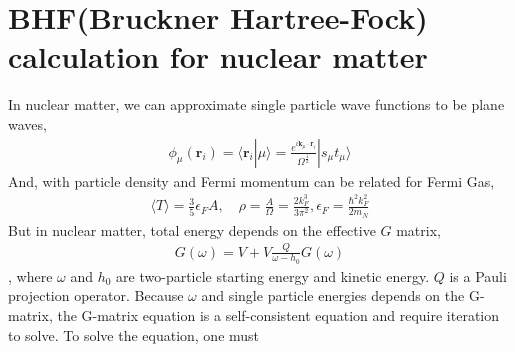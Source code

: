 \documentclass[10pt]{article}
\def\bm{\boldsymbol}
\newcommand{\bea}{\begin{eqnarray}}
\newcommand{\eea}{\end{eqnarray}}
\def\vk{{\bm k}}
\def\vr{{\bm r}}
\def\la{\langle}
\def\ra{\rangle}
\begin{document}
\section{BHF(Bruckner Hartree-Fock) calculation for nuclear matter}
In nuclear matter, we can approximate single particle wave functions to be plane waves,
\bea 
\phi_\mu(\vr_i)=\la \vr_i|\mu\ra 
 =\frac{e^{i\vk_\mu\cdot\vr_i}}{\Omega^{\frac{1}{2}}}|s_\mu t_\mu\ra 
\eea 
And, with particle density and Fermi momentum can be related for Fermi Gas,
\bea 
\la T\ra =\frac{3}{5}\epsilon_F A,\quad \rho=\frac{A}{\Omega}=\frac{2k_F^3}{3\pi^2},
 \epsilon_F=\frac{\hbar^2 k_F^2}{2m_N}
\eea 
But in nuclear matter, total energy depends on the effective $G$ matrix,
\bea 
G(\omega)=V+V\frac{Q}{\omega-h_0}G(\omega)
\eea 
, where $\omega$ and $h_0$ are two-particle starting energy and kinetic energy.
$Q$ is a Pauli projection operator. Because $\omega$ and single particle energies
depends on the G-matrix, the G-matrix equation is a self-consistent equation and
require iteration to solve. 
To solve the equation, one must
\end{document}

